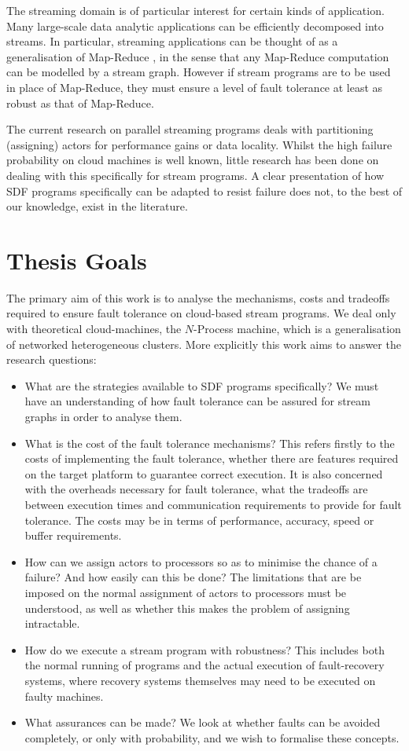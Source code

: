 The streaming domain is of particular interest for certain kinds of application.
Many large-scale data analytic applications can be efficiently decomposed into streams.
In particular, streaming applications can be thought of as a generalisation of Map-Reduce \cite{dea08}, in the sense that any Map-Reduce computation can be modelled by a stream graph.
However if stream programs are to be used in place of Map-Reduce, they must ensure a level of fault tolerance at least as robust as that of Map-Reduce.

The current research on parallel streaming programs deals with partitioning (assigning) actors for performance gains or data locality.
Whilst the high failure probability on cloud machines is well known, little research has been done on dealing with this specifically for stream programs.
A clear presentation of how SDF programs specifically can be adapted to resist failure does not, to the best of our knowledge, exist in the literature.

\section{Thesis Goals}
\label{secInGoal}

The primary aim of this work is to analyse the mechanisms, costs and tradeoffs required to ensure fault tolerance on cloud-based stream programs.
We deal only with theoretical cloud-machines, the $N$-Process machine, which is a generalisation of networked heterogeneous clusters.
More explicitly this work aims to answer the research questions:

\begin{itemize}
	\item What are the strategies available to SDF programs specifically?
			We must have an understanding of how fault tolerance can be assured for stream graphs in order to analyse them.
	\item What is the cost of the fault tolerance mechanisms?
			This refers firstly to the costs of implementing the fault tolerance, whether there are features required on the target platform to guarantee correct execution.
			It is also concerned with the overheads necessary for fault tolerance, what the tradeoffs are between execution times and communication requirements to provide for fault tolerance.
			The costs may be in terms of performance, accuracy, speed or buffer requirements.
	\item How can we assign actors to processors so as to minimise the chance of a failure?
			And how easily can this be done?
			The limitations that are be imposed on the normal assignment of actors to processors must be understood, as well as whether this makes the problem of assigning intractable.
	\item How do we execute a stream program with robustness?
			This includes both the normal running of programs and the actual execution of fault-recovery systems, where recovery systems themselves may need to be executed on faulty machines.
	\item What assurances can be made?
			We look at whether faults can be avoided completely, or only with probability, and we wish to formalise these concepts.
\end{itemize}

